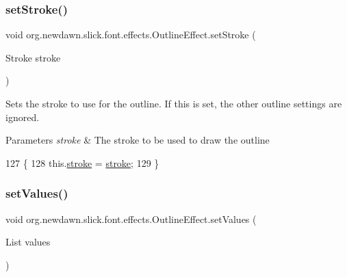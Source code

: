 \subsubsection{\texorpdfstring{set\+Stroke()}{setStroke()}}
{\footnotesize\ttfamily void org.\+newdawn.\+slick.\+font.\+effects.\+Outline\+Effect.\+set\+Stroke (\begin{DoxyParamCaption}\item[{Stroke}]{stroke }\end{DoxyParamCaption})\hspace{0.3cm}{\ttfamily [inline]}}

Sets the stroke to use for the outline. If this is set, the other outline settings are ignored.


\begin{DoxyParams}{Parameters}
{\em stroke} & The stroke to be used to draw the outline \\
\hline
\end{DoxyParams}

\begin{DoxyCode}
127                                           \{
128         this.\mbox{\hyperlink{classorg_1_1newdawn_1_1slick_1_1font_1_1effects_1_1_outline_effect_a4a9b2320afee8e246983b063c5cdafe9}{stroke}} = \mbox{\hyperlink{classorg_1_1newdawn_1_1slick_1_1font_1_1effects_1_1_outline_effect_a4a9b2320afee8e246983b063c5cdafe9}{stroke}};
129     \}
\end{DoxyCode}
\mbox{\label{classorg_1_1newdawn_1_1slick_1_1font_1_1effects_1_1_outline_effect_a02dbe78f6e87a036b850e35d3bbeb17c}} 
\subsubsection{\texorpdfstring{set\+Values()}{setValues()}}
{\footnotesize\ttfamily void org.\+newdawn.\+slick.\+font.\+effects.\+Outline\+Effect.\+set\+Values (\begin{DoxyParamCaption}\item[{List}]{values }\end{DoxyParamCaption})\hspace{0.3cm}{\ttfamily [inline]}}

